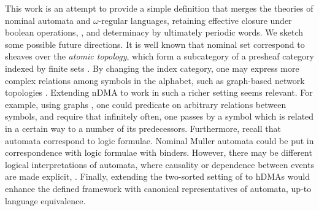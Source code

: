 This work is an attempt to provide a simple definition that merges the theories of nominal automata and $\omega$-regular languages, retaining effective closure under boolean operations, , and determinacy by ultimately periodic words. We sketch some possible future directions. It is well known that nominal set correspond to sheaves over the \emph{atomic topology}, which form a subcategory of a presheaf category indexed by finite sets \cite{fabio,staton}. By changing the index category, one may express more complex relations among symbols in the alphabet, such as graph-based network topologies \cite{matteo}. Extending nDMA to work in such a richer setting seems relevant. For example, using graphs , one could predicate on arbitrary relations between symbols, and require that infinitely often, one passes by a symbol which is related in a certain way to a number of its predecessors. Furthermore, recall that automata correspond to logic formulae. Nominal Muller automata could be put in correspondence with logic formulae with binders. However, there may be different logical interpretations of automata, where causality or dependence between events are made explicit, . Finally, extending the two-sorted setting of \cite{CV12} to hDMAs would enhance the defined framework with canonical representatives of automata, up-to language equivalence.

